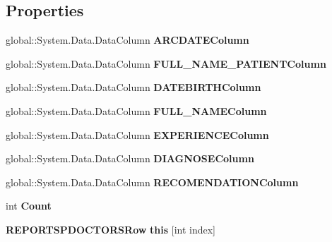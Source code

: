 \subsection*{Properties}
\begin{CompactItemize}
\item 
global::System.Data.DataColumn \textbf{ARCDATEColumn}\hspace{0.3cm}{\tt  [get]}\label{class_automatic_medical_system_1_1_data_set1_1_1_r_e_p_o_r_t_s_p_d_o_c_t_o_r_s_data_table_d80b0807354203c85222118aeee14b7e}

\item 
global::System.Data.DataColumn \textbf{FULL\_\-NAME\_\-PATIENTColumn}\hspace{0.3cm}{\tt  [get]}\label{class_automatic_medical_system_1_1_data_set1_1_1_r_e_p_o_r_t_s_p_d_o_c_t_o_r_s_data_table_6f25e3f5f8dff2fbc298c79928736f08}

\item 
global::System.Data.DataColumn \textbf{DATEBIRTHColumn}\hspace{0.3cm}{\tt  [get]}\label{class_automatic_medical_system_1_1_data_set1_1_1_r_e_p_o_r_t_s_p_d_o_c_t_o_r_s_data_table_9d369e26fc64637f16b22ebdba187e9e}

\item 
global::System.Data.DataColumn \textbf{FULL\_\-NAMEColumn}\hspace{0.3cm}{\tt  [get]}\label{class_automatic_medical_system_1_1_data_set1_1_1_r_e_p_o_r_t_s_p_d_o_c_t_o_r_s_data_table_3fa290fb4708b38ca5ca5d05a71061e0}

\item 
global::System.Data.DataColumn \textbf{EXPERIENCEColumn}\hspace{0.3cm}{\tt  [get]}\label{class_automatic_medical_system_1_1_data_set1_1_1_r_e_p_o_r_t_s_p_d_o_c_t_o_r_s_data_table_1dc5762ad8a196de30ab55fa6a65e4ec}

\item 
global::System.Data.DataColumn \textbf{DIAGNOSEColumn}\hspace{0.3cm}{\tt  [get]}\label{class_automatic_medical_system_1_1_data_set1_1_1_r_e_p_o_r_t_s_p_d_o_c_t_o_r_s_data_table_fb249fd42d090c9529a6292946eb0d21}

\item 
global::System.Data.DataColumn \textbf{RECOMENDATIONColumn}\hspace{0.3cm}{\tt  [get]}\label{class_automatic_medical_system_1_1_data_set1_1_1_r_e_p_o_r_t_s_p_d_o_c_t_o_r_s_data_table_c3286a8ff536dde2a54bd1eb5a2893f2}

\item 
int \textbf{Count}\hspace{0.3cm}{\tt  [get]}\label{class_automatic_medical_system_1_1_data_set1_1_1_r_e_p_o_r_t_s_p_d_o_c_t_o_r_s_data_table_0ae0ca29c4439f27193553be54544264}

\item 
{\bf REPORTSPDOCTORSRow} \textbf{this} [int index]\hspace{0.3cm}{\tt  [get]}\label{class_automatic_medical_system_1_1_data_set1_1_1_r_e_p_o_r_t_s_p_d_o_c_t_o_r_s_data_table_2dff6604df7b7f4154af67b1a7a6d54f}

\end{CompactItemize}
